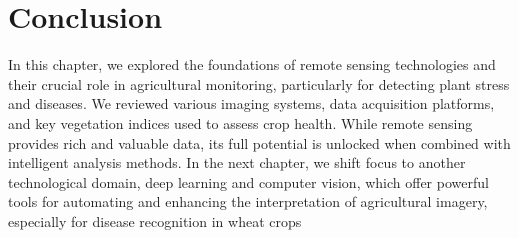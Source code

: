 \section{Conclusion}
In this chapter, we explored the foundations of remote sensing technologies and their crucial role in agricultural monitoring, particularly for detecting plant stress and diseases. We reviewed various imaging systems, data acquisition platforms, and key vegetation indices used to assess crop health. While remote sensing provides rich and valuable data, its full potential is unlocked when combined with intelligent analysis methods. In the next chapter, we shift focus to another technological domain, deep learning and computer vision, which offer powerful tools for automating and enhancing the interpretation of agricultural imagery, especially for disease recognition in wheat crops